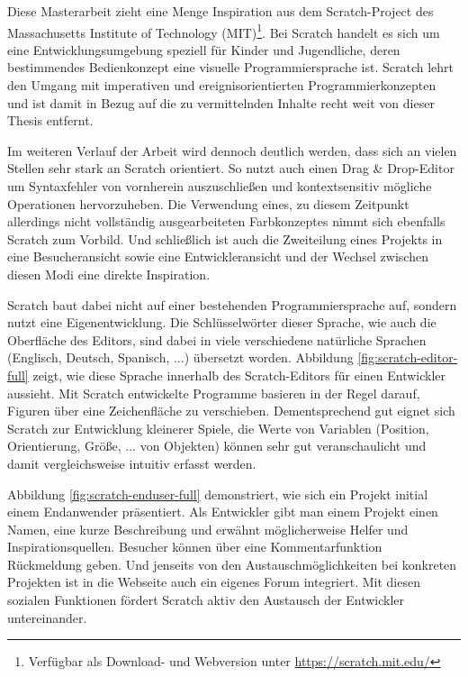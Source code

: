 Diese Masterarbeit zieht eine Menge Inspiration aus dem Scratch-Project des Massachusetts Institute of Technology (MIT)\footnote{Verfügbar als Download- und Webversion unter \url{https://scratch.mit.edu/}}. Bei Scratch handelt es sich um eine Entwicklungsumgebung speziell für Kinder und Jugendliche, deren bestimmendes Bedienkonzept eine visuelle Programmiersprache ist. Scratch lehrt den Umgang mit imperativen und ereignisorientierten Programmierkonzepten und ist damit in Bezug auf die zu vermittelnden Inhalte recht weit von dieser Thesis entfernt.

Im weiteren Verlauf der Arbeit wird dennoch deutlich werden, dass sich \idename{} an vielen Stellen sehr stark an Scratch orientiert. So nutzt auch \idename{} einen Drag \& Drop-Editor um Syntaxfehler von vornherein auszuschließen und kontextsensitiv mögliche Operationen hervorzuheben. Die Verwendung eines, zu diesem Zeitpunkt allerdings nicht vollständig ausgearbeiteten Farbkonzeptes nimmt sich ebenfalls Scratch zum Vorbild. Und schließlich ist auch die Zweiteilung eines Projekts in eine Besucheransicht sowie eine Entwickleransicht und der Wechsel zwischen diesen Modi eine direkte Inspiration.

Scratch baut dabei nicht auf einer bestehenden Programmiersprache auf, sondern nutzt eine Eigenentwicklung. Die Schlüsselwörter dieser Sprache, wie auch die Oberfläche des Editors, sind dabei in viele verschiedene natürliche Sprachen (Englisch, Deutsch, Spanisch, ...) übersetzt worden. Abbildung \ref{fig:scratch-editor-full} zeigt, wie diese Sprache innerhalb des Scratch-Editors für einen Entwickler aussieht. Mit Scratch entwickelte Programme basieren in der Regel darauf, Figuren über eine Zeichenfläche zu verschieben. Dementsprechend gut eignet sich Scratch zur Entwicklung kleinerer Spiele, die Werte von Variablen (Position, Orientierung, Größe, ... von Objekten) können sehr gut veranschaulicht und damit vergleichsweise intuitiv erfasst werden.

Abbildung \ref{fig:scratch-enduser-full} demonstriert, wie sich ein Projekt initial einem Endanwender präsentiert. Als Entwickler gibt man einem Projekt einen Namen, eine kurze Beschreibung und erwähnt möglicherweise Helfer und Inspirationsquellen. Besucher können über eine Kommentarfunktion Rückmeldung geben. Und jenseits von den Austauschmöglichkeiten bei konkreten Projekten ist in die Webseite auch ein eigenes Forum integriert. Mit diesen sozialen Funktionen fördert Scratch aktiv den Austausch der Entwickler untereinander.

